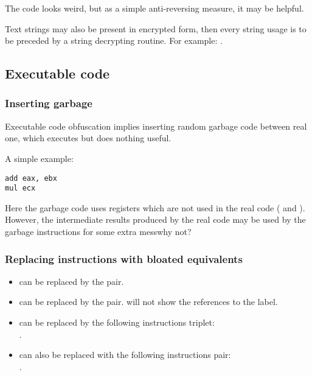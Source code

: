 The code looks weird, but as a simple anti-reversing measure, it may be helpful.

Text strings may also be present in encrypted form, 
then every string usage is to be preceded by a string decrypting routine.
For example: .

\subsection{Executable code}

\subsubsection{Inserting garbage}

Executable code obfuscation implies inserting random garbage code between real one,
which executes but does nothing useful.

A simple example:

\begin{lstlisting}[caption=original code]
add	eax, ebx
mul	ecx
\end{lstlisting}



Here the garbage code uses registers which are not used in the real code ( and ).
However, the intermediate results produced by the real code 
may be used by the garbage instructions for some extra mess\EMDASH{}why not?

\subsubsection{Replacing instructions with bloated equivalents}

\begin{itemize}
\item {} can be replaced by the  pair.
\item {} can be replaced by the  pair. 
\IDA{} will not show the references to the label.
\item {} can be replaced by the following instructions triplet:\\
.
\item {} can also be replaced with the following instructions pair: \\
.%

\end{itemize}

